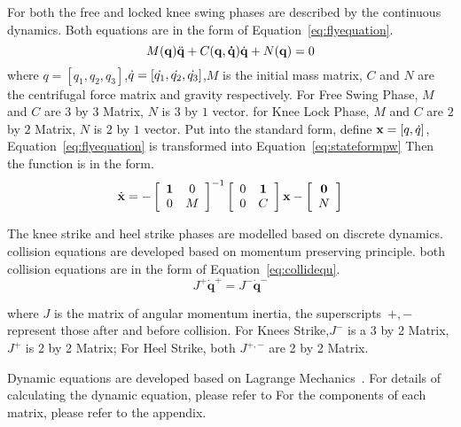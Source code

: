 \begin{itemize}
For both the free and locked knee swing phases are described by the continuous dynamics.
Both equations are in the form of Equation~\ref{eq:flyequation}.
\begin{equation}
\label{eq:flyequation}
M(\mathbf{q}) \ddot{\mathbf{q}} + C(\mathbf{q,\dot{q}})\dot{\mathbf{q}} + N(\mathbf{q}) = 0
\end{equation}
where $q=[q_1,q_2,q_3]$,$\dot{q}=[\dot{q_1},\dot{q_2},\dot{q_3}]$,$M$ is the initial mass matrix, $C$ and $N$ are the centrifugal force matrix and gravity respectively. 
For Free Swing Phase,  $M$ and $C$ are $3$ by $3$ Matrix, $N$ is $3$ by $1$ vector.
for Knee Lock Phase, $M$ and $C$ are $2$ by $2$ Matrix, $N$ is $2$ by $1$ vector.
Put into the standard form, define $\mathbf{x}=[q,\dot{q}]$, Equation~\ref{eq:flyequation} is transformed into Equation~\ref{eq:stateformpw}
Then the function is in the form.
\begin{equation}
\label{eq:stateformpw}
\dot{\mathbf{x}}=
-\left[ 
\begin{array}{cc}
\mathbf{1} &0\\
0 &M 
\end{array}
\right]^{-1}
\left[ 
\begin{array}{cc}
0 &\mathbf{1}\\
0 &C 
\end{array}
\right]\mathbf{x}
-\left[ 
\begin{array}{c}
\mathbf{0}\\
 N 
\end{array}
\right]
\end{equation}

The knee strike and heel strike phases are modelled based on discrete dynamics.
collision equations are developed based on momentum preserving principle.
both collision equations are in the form of Equation~\ref{eq:collidequ}.
\begin{equation}
\label{eq:collidequ}
J^{+}\dot{\mathbf{q}}^{+} = J^{-}\dot{\mathbf{q}}^{-}
\end{equation}

where $J$ is the matrix of angular momentum inertia, the superscripts~$+,-$ represent those after and before collision.
For Knees Strike,$J^-$ is a 3 by 2 Matrix, $J^+$ is 2 by 2 Matrix;
For Heel Strike, both $J^{+,-}$ are 2 by 2 Matrix.
\end{itemize}
Dynamic equations are developed based on Lagrange Mechanics~\citep{Goldstein2002}.
For details of calculating the dynamic equation, please refer to \citep{Chen2007}
For the components of each matrix, please refer to the appendix.


